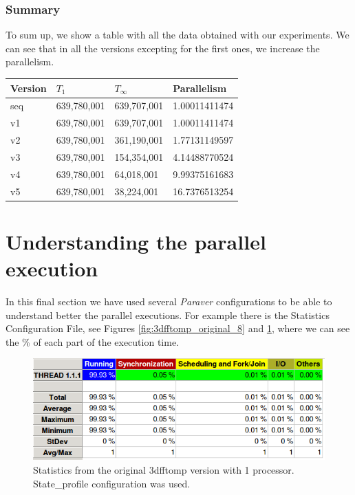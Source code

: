 \documentclass[12]{article}
\begin{document}
\subsubsection{Summary}
To sum up, we show a table with all the data obtained with our experiments. We can see that in all the versions excepting for the first ones, we increase the parallelism.
\\
\medskip
\begin{table}[H]
\centering
\begin{tabular}{|l|l|l|l|}
\hline
Version & $T_1 $ & $T_\infty$ & Parallelism \\ \hline
seq     & 639,780,001   & 639,707,001    &        1.00011411474     \\ \hline
v1      &  639,780,001  & 639,707,001  &         1.00011411474      \\ \hline
v2      & 639,780,001   & 361,190,001   &      1.77131149597      \\ \hline
v3      & 639,780,001   & 154,354,001&         4.14488770524    \\ \hline
v4      & 639,780,001   &  64,018,001   &        9.99375161683     \\ \hline
v5      &639,780,001     & 38,224,001  &        16.7376513254    \\ \hline
\end{tabular}
\end{table}

\section{Understanding the parallel execution}
In this final section we have used several \textit{Paraver} configurations to be able to understand better the parallel executions. For example there is the Statistics Configuration File, see Figures \ref{fig:3dfftomp_original_8} and \ref{fig:3dfftomp_original_1}, where we can see the \% of each part of the execution time. 





\begin{figure}[H]
\centering  \includegraphics[width=\linewidth]{images/3dfftomp_original_1.png}
  \caption{Statistics from the original 3dfftomp version with 1 processor. State\_profile configuration was used.}
  \label{fig:3dfftomp_original_1}
\end{figure}
\end{document}
